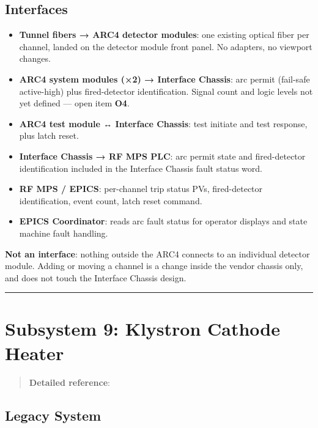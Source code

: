 \subsection{Interfaces}\label{arc-interfaces}

\begin{itemize}
\tightlist
\item
  \textbf{Tunnel fibers → ARC4 detector modules}: one existing optical fiber per channel, landed on the detector module front panel. No adapters, no viewport changes.
\item
  \textbf{ARC4 system modules (×2) → Interface Chassis}: arc permit (fail-safe active-high) plus fired-detector identification. Signal count and logic levels not yet defined --- open item \textbf{O4}.
\item
  \textbf{ARC4 test module ↔ Interface Chassis}: test initiate and test response, plus latch reset.
\item
  \textbf{Interface Chassis → RF MPS PLC}: arc permit state and fired-detector identification included in the Interface Chassis fault status word.
\item
  \textbf{RF MPS / EPICS}: per-channel trip status PVs, fired-detector identification, event count, latch reset command.
\item
  \textbf{EPICS Coordinator}: reads arc fault status for operator displays and state machine fault handling.
\end{itemize}

\textbf{Not an interface}: nothing outside the ARC4 connects to an individual detector module. Adding or moving a channel is a change inside the vendor chassis only, and does not touch the Interface Chassis design.

\begin{center}\rule{0.5\linewidth}{0.5pt}\end{center}

\section{Subsystem 9: Klystron Cathode Heater}\label{subsystem-9-klystron-cathode-heater}

\begin{quote}
\textbf{Detailed reference}: 
\end{quote}

\subsection{Legacy System}\label{legacy-system-2}

